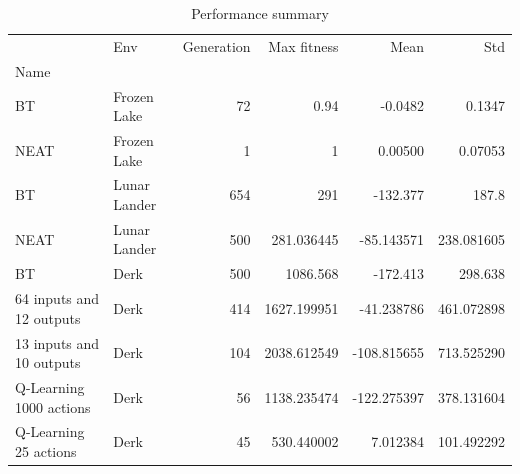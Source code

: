 
\begin{table}
    \caption{Performance summary}
    \begin{center}
        \begin{tabular}{llrrrr}
        \toprule
        {}   &  Env & Generation &  Max fitness &        Mean &         Std \\
        Name &  &  &  &  &  \\
        \midrule
        BT          & Frozen Lake & 72 & 0.94 &  -0.0482 & 0.1347 \\
        NEAT        & Frozen Lake & 1 & 1 &  0.00500 & 0.07053 \\
        BT          & Lunar Lander & 654 &  291 &  -132.377  & 187.8  \\
        NEAT        & Lunar Lander & 500 &  281.036445 &  -85.143571 & 238.081605 \\
        BT          & Derk &  500 &  1086.568 & -172.413   & 298.638  \\
        64 inputs and 12 outputs & Derk & 414 & 1627.199951 &  -41.238786 & 461.072898 \\
        13 inputs and 10 outputs & Derk & 104 & 2038.612549 & -108.815655 & 713.525290 \\
        Q-Learning 1000 actions  & Derk &  56 & 1138.235474 & -122.275397 & 378.131604 \\
        Q-Learning 25 actions    & Derk &  45 &  530.440002 &    7.012384 & 101.492292 \\
        \bottomrule
        \end{tabular}
    \end{center}
    \label{tab:performance-summary}
\end{table}


